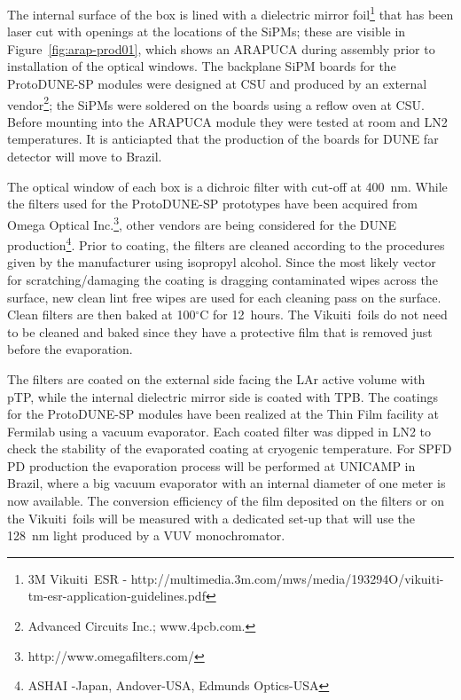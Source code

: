 The internal surface of the box is lined with a dielectric mirror foil\footnote{3M Vikuiti\texttrademark\  ESR - http://multimedia.3m.com/mws/media/193294O/vikuiti-tm-esr-application-guidelines.pdf} that has been laser cut with openings at the locations of the SiPMs; these are visible in Figure~\ref{fig:arap-prod01}, which shows an ARAPUCA during assembly prior to installation of the optical windows. The backplane SiPM boards for the ProtoDUNE-SP modules were designed at CSU and produced by an external vendor\footnote{Advanced Circuits Inc.; www.4pcb.com.}; the SiPMs were soldered on the boards using a reflow oven at CSU. Before mounting into the ARAPUCA module they were tested at room and LN2 temperatures. It is anticiapted that the production of the boards for DUNE far detector will move to Brazil.

The optical window of each box is a dichroic filter with cut-off at \SI{400}{nm}. While the filters used for the ProtoDUNE-SP prototypes have been acquired from Omega Optical Inc.\footnote{http://www.omegafilters.com/}, other vendors are being considered for the DUNE production\footnote{ASHAI -Japan, Andover-USA, Edmunds Optics-USA}.
Prior to coating, the filters are cleaned according to the procedures given by the manufacturer using isopropyl alcohol. Since the most likely vector for scratching/damaging the coating is dragging contaminated wipes across the surface, new clean lint free wipes are used for each  cleaning pass on the surface. Clean filters are then baked at 100$^\circ$C for \SI{12}{hours}. The Vikuiti\texttrademark\  foils do not need to be cleaned and baked since they have a protective film that is removed just before the evaporation.
   
The filters are coated on the external side facing the LAr active volume with pTP,
while the internal dielectric mirror side is coated with TPB.
The coatings for the ProtoDUNE-SP modules have been realized at the Thin Film facility at Fermilab using a vacuum evaporator. Each coated filter was dipped in LN2 to check the stability of the evaporated coating at cryogenic temperature. For SPFD PD production the evaporation process will be performed at UNICAMP in Brazil, where a big vacuum evaporator with an internal diameter of one meter is now available. The  conversion efficiency of the film deposited on the filters or on the Vikuiti\texttrademark\   foils will be measured with a dedicated set-up that will use the \SI{128}{nm} light produced by a VUV monochromator.


